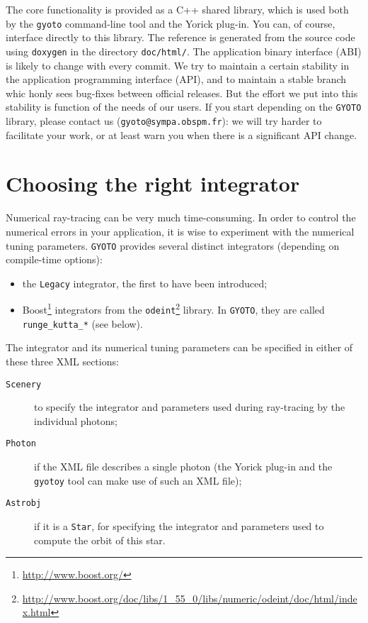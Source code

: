 \documentclass[a4paper,12pt]{article}
\begin{document}
The core functionality is provided as a C++ shared library, which is
used both by the \texttt{gyoto} command-line tool and the Yorick
plug-in. You can, of course, interface directly to this library. The
reference is generated from the source code using \texttt{doxygen} in
the directory \texttt{doc/html/}. The application binary interface
(ABI) is likely to change with every commit. We try to maintain a
certain stability in the application programming interface (API), and
to maintain a stable branch whic honly sees bug-fixes between official
releases. But the effort we put into this stability is function of the
needs of our users. If you start depending on the \texttt{GYOTO}
library, please contact us (\texttt{gyoto@sympa.obspm.fr}): we will
try harder to facilitate your work, or at least warn you when there is
a significant API change.

\section{Choosing the right integrator}
\label{tuning}

Numerical ray-tracing can be very much time-consuming. In order to
control the numerical errors in your application, it is wise to
experiment with the numerical tuning parameters. \texttt{GYOTO}
provides several distinct integrators (depending on compile-time
options):
\begin{itemize}
\item the \texttt{Legacy} integrator, the first to have been introduced;
\item Boost\footnote{\url{http://www.boost.org/}} integrators from the
  \texttt{odeint}\footnote{\url{http://www.boost.org/doc/libs/1_55_0/libs/numeric/odeint/doc/html/index.html}}
  library. In \texttt{GYOTO}, they are called
  \texttt{runge\_kutta\_*} (see below).
\end{itemize}

The integrator and its numerical tuning parameters can be specified in
either of these three XML sections:
\begin{description}
\item[\texttt{Scenery}] to specify the integrator and parameters used
  during ray-tracing by the individual photons;
\item[\texttt{Photon}] if the XML file describes a single photon (the
  Yorick plug-in and the \texttt{gyotoy} tool can make use of such an
  XML file);
\item[\texttt{Astrobj}] if it is a \texttt{Star}, for specifying the
  integrator and parameters used to compute the orbit of this star.
\end{description}
\end{document}
